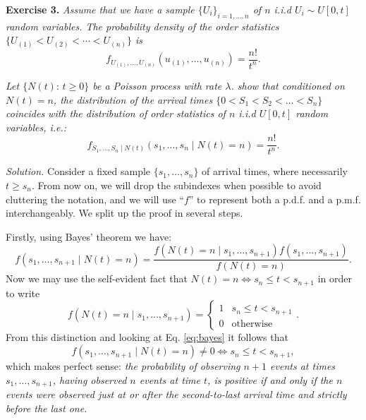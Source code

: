 
\textbf{Exercise 3. }\emph{Assume that we have a sample \( \{U_{i}\}_{i=1,\dots,n} \) of \( n \) i.i.d  \(U_{i} \sim U[0, t] \) random variables. The probability density of the order statistics \( \{U_{(1)} < U_{(2)} < \cdots < U_{(n)}\} \)  is}
\[
  f_{U_{(1)},\dots,U_{(n)}}(u_{(1)},\dots,u_{(n)}) = \frac{n!}{t^{n}}.
\]

\emph{Let \( \{N(t): \, t \geq 0\} \) be a Poisson process with rate \( \lambda \). show that conditioned on \( N(t) = n \), the distribution of the arrival times \( \{0 < S_{1} < S_{2} < \dots < S_{n}\} \) coincides with the distribution of order statistics of \( n \) i.i.d \( U[0, t] \) random variables, i.e.:}
\[
  f_{S_{1},\dots,S_{n} \mid N(t)}(s_{1},\dots, s_{n} \mid N(t) = n) = \frac{n!}{t^{n}}.
\]

\emph{Solution.} Consider a fixed sample $\{s_1, \dots, s_n\}$ of arrival times, where necessarily $t\geq s_n$. From now on, we will drop the subindexes when possible to avoid cluttering the notation, and we will use ``$f$'' to represent both a p.d.f. and a p.m.f. interchangeably. We split up the proof in several steps.

Firstly, using Bayes' theorem we have:
\begin{equation}
  \label{eq:bayes}
  f(s_{1},\dots, s_{n+1} \mid N(t) = n) = \frac{ f(N(t) = n \mid s_{1},\dots, s_{n+1}) f(s_{1},\dots, s_{n+1})  }{ f(N(t) = n)  }.
\end{equation}
Now we may use the self-evident fact that \( N(t) = n \iff s_{n} \leq t < s_{n+1} \) in order to write
\[
  f(N(t) = n \mid s_{1},\dots, s_{n+1}) = \begin{cases} 1 & s_{n} \leq t < s_{n+1}\\ 0 &\text{otherwise} \end{cases}.
\]
From this distinction and looking at Eq. \eqref{eq:bayes} it follows that
\[
   f(s_{1},\dots,s_{n+1} \mid N(t) = n) \neq 0 \iff s_{n} \leq t < s_{n+1},
 \]
 which makes perfect sense: \emph{the probability of observing $n+1$ events at times $s_1, \dots, s_{n+1}$, having observed $n$ events at time $t$, is positive if and only if the $n$ events were observed just at or after the second-to-last arrival time and strictly before the last one.}

